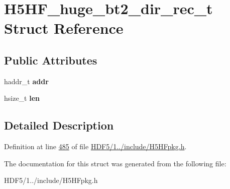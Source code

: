 \hypertarget{struct_h5_h_f__huge__bt2__dir__rec__t}{}\section{H5\+H\+F\+\_\+huge\+\_\+bt2\+\_\+dir\+\_\+rec\+\_\+t Struct Reference}
\label{struct_h5_h_f__huge__bt2__dir__rec__t}
\subsection*{Public Attributes}
\begin{DoxyCompactItemize}
\item 
\mbox{\label{struct_h5_h_f__huge__bt2__dir__rec__t_ad8cc90bf343886265ff07e033e652f12}} 
haddr\+\_\+t {\bfseries addr}
\item 
\mbox{\label{struct_h5_h_f__huge__bt2__dir__rec__t_a112cea7b93b26da62cffadae5531b3b4}} 
hsize\+\_\+t {\bfseries len}
\end{DoxyCompactItemize}


\subsection{Detailed Description}


Definition at line \hyperlink{_h_d_f5_21_810_81_2include_2_h5_h_fpkg_8h_source_l00485}{485} of file \hyperlink{_h_d_f5_21_810_81_2include_2_h5_h_fpkg_8h_source}{H\+D\+F5/1../include/\+H5\+H\+Fpkg.\+h}.



The documentation for this struct was generated from the following file\+:\begin{DoxyCompactItemize}
\item 
H\+D\+F5/1../include/\+H5\+H\+Fpkg.\+h\end{DoxyCompactItemize}
